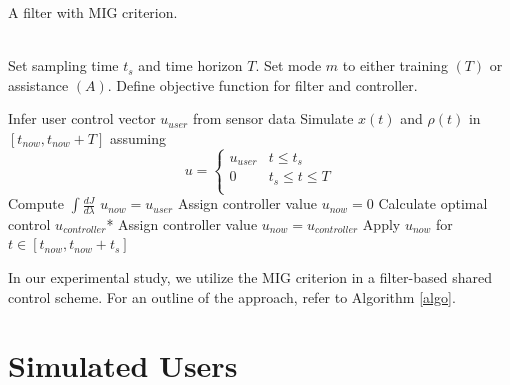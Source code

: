 \noindent\begin{minipage}{\columnwidth}
\renewcommand\footnoterule{} 
\begin{algorithm}[H]
	\caption{A filter with MIG criterion.}\label{algo}
	\noindent{}
		    \\         
        Set sampling time $t_s$ and time horizon $T$. Set mode $m$ to either training $(T)$ or assistance $(A)$. Define objective function for filter and controller.
		\begin{algorithmic}[1]
			\State Infer user control vector $u_{user}$ from sensor data
			\State Simulate $x(t)$ and $\rho(t)$ in $[t_{now}, t_{now} + T]$ assuming \[ u =  \left\{
			\begin{array}{ll}
      			u_{user} & t\leq t_s \\
      			0 & t_s\leq t\leq T \\
			\end{array} 
			\right. \]
			\State Compute $\int \frac{dJ}{d\lambda}$
			\State $u_{now} = u_{user}$
			\Else
			\State Assign controller value
			$ u_{now} = 0 $
			\State Calculate optimal control $u_{controller}$*
			\State Assign controller value 
			$ u_{now} = u_{controller} $
			\EndIf
			\EndIf
			\State Apply $u_{now}$ for $ t \in [t_{now}, t_{now}+t_s]$
			\EndWhile
		\end{algorithmic}	
	\end{algorithm}
	\renewcommand\footnoterule{}
\end{minipage}
\vspace{0.7cm}

In our experimental study, we utilize the MIG criterion in a filter-based shared control scheme. For an outline of the approach, refer to Algorithm \ref{algo}. 


\section{Simulated Users}
\label{section: simulated users}


